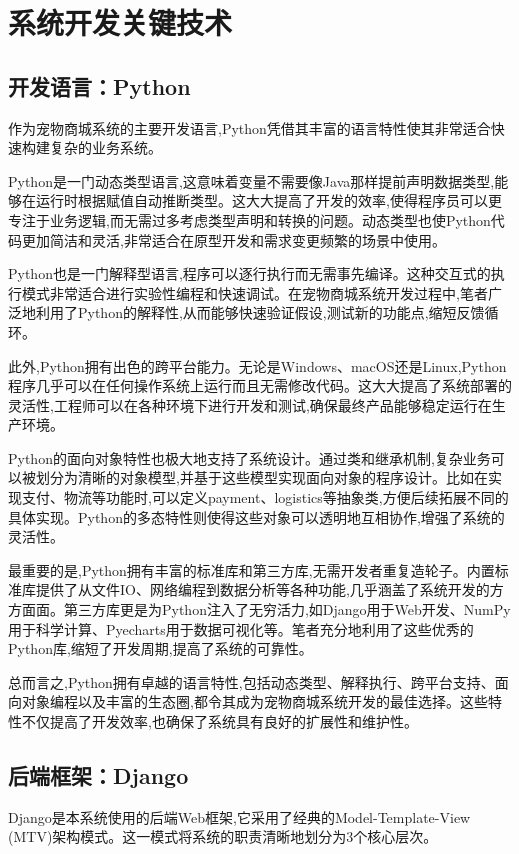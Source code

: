 

\chapter{系统开发关键技术}

\section{开发语言：Python}
作为宠物商城系统的主要开发语言,Python凭借其丰富的语言特性使其非常适合快速构建复杂的业务系统。

Python是一门动态类型语言,这意味着变量不需要像Java那样提前声明数据类型,能够在运行时根据赋值自动推断类型。这大大提高了开发的效率,使得程序员可以更专注于业务逻辑,而无需过多考虑类型声明和转换的问题。动态类型也使Python代码更加简洁和灵活,非常适合在原型开发和需求变更频繁的场景中使用。

Python也是一门解释型语言,程序可以逐行执行而无需事先编译。这种交互式的执行模式非常适合进行实验性编程和快速调试。在宠物商城系统开发过程中,笔者广泛地利用了Python的解释性,从而能够快速验证假设,测试新的功能点,缩短反馈循环。

此外,Python拥有出色的跨平台能力。无论是Windows、macOS还是Linux,Python程序几乎可以在任何操作系统上运行而且无需修改代码。这大大提高了系统部署的灵活性,工程师可以在各种环境下进行开发和测试,确保最终产品能够稳定运行在生产环境。

Python的面向对象特性也极大地支持了系统设计。通过类和继承机制,复杂业务可以被划分为清晰的对象模型,并基于这些模型实现面向对象的程序设计。比如在实现支付、物流等功能时,可以定义payment、logistics等抽象类,方便后续拓展不同的具体实现。Python的多态特性则使得这些对象可以透明地互相协作,增强了系统的灵活性。

最重要的是,Python拥有丰富的标准库和第三方库,无需开发者重复造轮子。内置标准库提供了从文件IO、网络编程到数据分析等各种功能,几乎涵盖了系统开发的方方面面。第三方库更是为Python注入了无穷活力,如Django用于Web开发、NumPy用于科学计算、Pyecharts用于数据可视化等。笔者充分地利用了这些优秀的Python库,缩短了开发周期,提高了系统的可靠性。

总而言之,Python拥有卓越的语言特性,包括动态类型、解释执行、跨平台支持、面向对象编程以及丰富的生态圈,都令其成为宠物商城系统开发的最佳选择。这些特性不仅提高了开发效率,也确保了系统具有良好的扩展性和维护性。

\section{后端框架：Django}
Django是本系统使用的后端Web框架,它采用了经典的Model-Template-View (MTV)架构模式。这一模式将系统的职责清晰地划分为3个核心层次。

